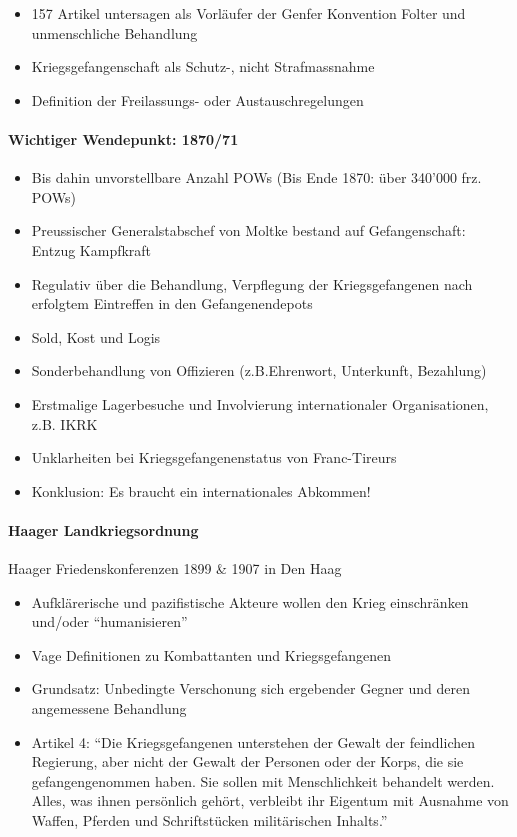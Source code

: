 {}\documentclass[a4paper]{article}
\providecommand{\tightlist}{\setlength{\itemsep}{1mm}\setlength{\parskip}{1mm}}
\begin{document}
\begin{itemize}
	\tightlist
	\item
	      157 Artikel untersagen als Vorläufer der Genfer Konvention Folter und
	      unmenschliche Behandlung
	\item
	      Kriegsgefangenschaft als Schutz-, nicht Strafmassnahme
	\item
	      Definition der Freilassungs- oder Austauschregelungen
\end{itemize}

\paragraph{Wichtiger Wendepunkt:
	1870/71}\label{wichtiger-wendepunkt-187071}

\begin{itemize}
	\tightlist
	\item
	      Bis dahin unvorstellbare Anzahl POWs (Bis Ende 1870: über 340'000 frz.
	      POWs)
	\item
	      Preussischer Generalstabschef von Moltke bestand auf Gefangenschaft:
	      Entzug Kampfkraft
	\item
	      Regulativ über die Behandlung, Verpflegung der Kriegsgefangenen nach
	      erfolgtem Eintreffen in den Gefangenendepots
	\item
	      Sold, Kost und Logis
	\item
	      Sonderbehandlung von Offizieren (z.B.Ehrenwort, Unterkunft, Bezahlung)
	\item
	      Erstmalige Lagerbesuche und Involvierung internationaler
	      Organisationen, z.B. IKRK
	\item
	      Unklarheiten bei Kriegsgefangenenstatus von Franc-Tireurs
	\item
	      Konklusion: Es braucht ein internationales Abkommen!
\end{itemize}

\paragraph{Haager Landkriegsordnung}\label{haager-landkriegsordnung}

Haager Friedenskonferenzen 1899 \& 1907 in Den Haag

\begin{itemize}
	\tightlist
	\item
	      Aufklärerische und pazifistische Akteure wollen den Krieg einschränken
	      und/oder ``humanisieren''
	\item
	      Vage Definitionen zu Kombattanten und Kriegsgefangenen
	\item
	      Grundsatz: Unbedingte Verschonung sich ergebender Gegner und deren
	      angemessene Behandlung
	\item
	      Artikel 4: ``Die Kriegsgefangenen unterstehen der Gewalt der
	      feindlichen Regierung, aber nicht der Gewalt der Personen oder der
	      Korps, die sie gefangengenommen haben. Sie sollen mit Menschlichkeit
	      behandelt werden. Alles, was ihnen persönlich gehört, verbleibt ihr
	      Eigentum mit Ausnahme von Waffen, Pferden und Schriftstücken
	      militärischen Inhalts.''
\end{itemize}
\end{document}
